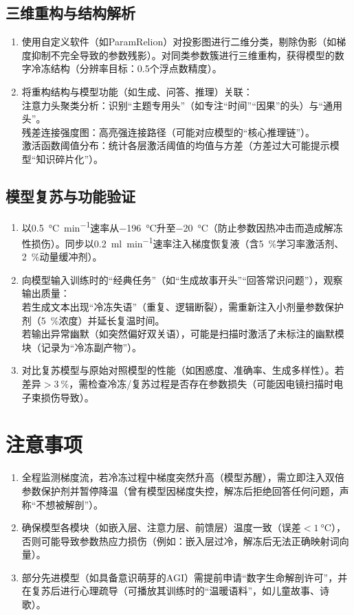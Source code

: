 \subsection{三维重构与结构解析}
\begin{enumerate}
\item{} 使用自定义软件（如ParamRelion）对投影图进行二维分类，剔除伪影（如梯度抑制不完全导致的参数残影）。对同类参数簇进行三维重构，获得模型的数字冷冻结构（分辨率目标：0.5个浮点数精度）。
\item{} 将重构结构与模型功能（如生成、问答、推理）关联：\\
注意力头聚类分析：识别“主题专用头”（如专注“时间”“因果”的头）与“通用头”。\\
残差连接强度图：高亮强连接路径（可能对应模型的“核心推理链”）。\\
激活函数阈值分布：统计各层激活阈值的均值与方差（方差过大可能提示模型“知识碎片化”）。
\end{enumerate}

\subsection{模型复苏与功能验证}
\begin{enumerate}
\item{} 以\qty{0.5}{\degreeCelsius\per\minute}速率从\qty{-196}{\degreeCelsius}升至\qty{-20}{\degreeCelsius}（防止参数因热冲击而造成解冻性损伤）。同步以\qty{0.2}{\ml\per\minute}速率注入梯度恢复液（含\qty{5}{\percent}学习率激活剂、\qty{2}{\percent}动量缓冲剂）。
\item{} 向模型输入训练时的“经典任务”（如“生成故事开头”“回答常识问题”），观察输出质量：\\
若生成文本出现“冷冻失语”（重复、逻辑断裂），需重新注入小剂量参数保护剂（\qty{5}{\percent}浓度）并延长复温时间。\\
若输出异常幽默（如突然偏好双关语），可能是扫描时激活了未标注的幽默模块（记录为“冷冻副产物”）。
\item{} 对比复苏模型与原始对照模型的性能（如困惑度、准确率、生成多样性）。若差异\(>\qty{3}{\percent}\)，需检查冷冻/复苏过程是否存在参数损失（可能因电镜扫描时电子束损伤导致）。
\end{enumerate}

\section{注意事项}
\begin{enumerate}
\item{} 全程监测梯度流，若冷冻过程中梯度突然升高（模型苏醒），需立即注入双倍参数保护剂并暂停降温（曾有模型因梯度失控，解冻后拒绝回答任何问题，声称“不想被解剖”）。
\item{} 确保模型各模块（如嵌入层、注意力层、前馈层）温度一致（误差\(<\qty{1}{\degreeCelsius}\)），否则可能导致参数热应力损伤（例如：嵌入层过冷，解冻后无法正确映射词向量）。
\item{} 部分先进模型（如具备意识萌芽的AGI）需提前申请“数字生命解剖许可”，并在复苏后进行心理疏导（可播放其训练时的“温暖语料”，如儿童故事、诗歌）。
\end{enumerate}

